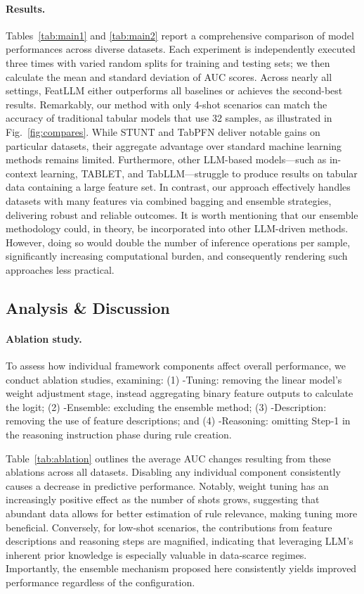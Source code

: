 \vspace*{-0.12in}
\paragraph{Results.}
Tables~\ref{tab:main1} and \ref{tab:main2} report a comprehensive comparison of model performances across diverse datasets. Each experiment is independently executed three times with varied random splits for training and testing sets; we then calculate the mean and standard deviation of AUC scores. Across nearly all settings, \textsf{FeatLLM} either outperforms all baselines or achieves the second-best results. Remarkably, our method with only 4-shot scenarios can match the accuracy of traditional tabular models that use 32 samples, as illustrated in Fig.~\ref{fig:compares}. While STUNT and TabPFN deliver notable gains on particular datasets, their aggregate advantage over standard machine learning methods remains limited. Furthermore, other LLM-based models—such as in-context learning, TABLET, and TabLLM—struggle to produce results on tabular data containing a large feature set. In contrast, our approach effectively handles datasets with many features via combined bagging and ensemble strategies, delivering robust and reliable outcomes. It is worth mentioning that our ensemble methodology could, in theory, be incorporated into other LLM-driven methods. However, doing so would double the number of inference operations per sample, significantly increasing computational burden, and consequently rendering such approaches less practical.

\subsection{Analysis \& Discussion}
\label{sec:analysis}
\paragraph{Ablation study.} To assess how individual framework components affect overall performance, we conduct ablation studies, examining: (1) \textsf{-Tuning}: removing the linear model's weight adjustment stage, instead aggregating binary feature outputs to calculate the logit; (2) \textsf{-Ensemble}: excluding the ensemble method; (3) \textsf{-Description}: removing the use of feature descriptions; and (4) \textsf{-Reasoning}: omitting Step-1 in the reasoning instruction phase during rule creation.

Table~\ref{tab:ablation} outlines the average AUC changes resulting from these ablations across all datasets. Disabling any individual component consistently causes a decrease in predictive performance. Notably, weight tuning has an increasingly positive effect as the number of shots grows, suggesting that abundant data allows for better estimation of rule relevance, making tuning more beneficial. Conversely, for low-shot scenarios, the contributions from feature descriptions and reasoning steps are magnified, indicating that leveraging LLM’s inherent prior knowledge is especially valuable in data-scarce regimes. Importantly, the ensemble mechanism proposed here consistently yields improved performance regardless of the configuration.

